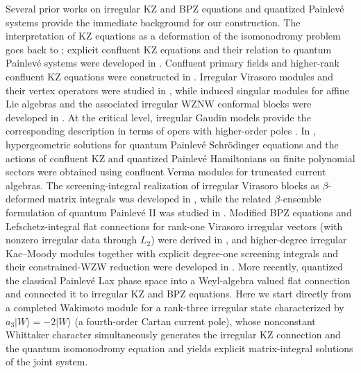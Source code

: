 \documentclass[a4paper,11pt]{article}
\numberwithin{equation}{section}
\begin{document}
Several prior works on irregular KZ and BPZ equations and quantized
Painlev\'e systems provide the immediate background for our
construction.  The interpretation of KZ equations as a deformation
of the isomonodromy problem goes back to \cite{Resh-KZ};
explicit confluent KZ equations and their relation to quantum
Painlev\'e systems were developed in \cite{JimboNagoyaSun2008}.
Confluent primary fields and higher-rank confluent KZ equations
were constructed in \cite{Nagoya_2010,NagoyaSunConfluent2011}.
Irregular Virasoro modules and their vertex operators were studied
in \cite{Gaiotto:2009ma,Gaiotto:2012sf,Nagoya:2015cja},
while induced singular modules for affine Lie algebras and the
associated irregular WZNW conformal blocks were developed in
\cite{Felder:2020ugk}.  At the critical level, irregular Gaudin
models provide the corresponding description in terms of opers
with higher-order poles \cite{FeiginFrenkelToledanoLaredo2010}.
In \cite{Nagoya2011}, hypergeometric solutions for
quantum Painlev\'e Schr\"odinger equations and the actions of
confluent KZ and quantized Painlev\'e Hamiltonians on finite polynomial
sectors were obtained using confluent Verma modules for truncated
current algebras.  The screening-integral realization of irregular
Virasoro blocks as $\beta$-deformed matrix integrals was developed in
\cite{Dijkgraaf:2009pc,Nishinaka:2012kn,Rim:2012tf,Choi:2014qha},
while the related $\beta$-ensemble formulation of
quantum Painlev\'e II was studied in \cite{Rumanov2014}.  Modified BPZ
equations and Lefschetz-integral flat connections for rank-one
Virasoro irregular vectors (with nonzero irregular data through
$L_{2}$) were derived in
\cite[Section~2.1]{HaghighatLiuReshetikhin2023}, and higher-degree
irregular Kac--Moody modules together with explicit degree-one
screening integrals and their constrained-WZW reduction were developed
in \cite{GukovHaghighatLiuReshetikhin2024,Haghighat2025}.  More
recently, \cite[Sections~2.2, 3.3 and~4.6]{BanerjeeHaghighatLatifi2026}
quantized the classical Painlev\'e Lax phase space into a Weyl-algebra
valued flat connection and connected it to irregular KZ and BPZ
equations.  Here we start directly from a completed Wakimoto module
for a rank-three irregular state characterized by
$a_{3}|W\rangle=-2|W\rangle$ (a fourth-order Cartan current pole),
whose nonconstant Whittaker character simultaneously generates the
irregular KZ connection and the quantum isomonodromy equation and
yields explicit matrix-integral solutions of the joint system.
\end{document}
